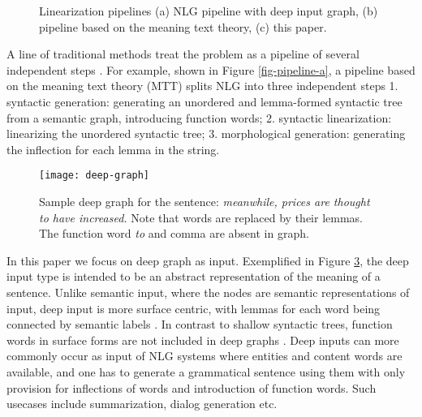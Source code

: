 \documentclass[11pt]{article}
\begin{document}
\begin{figure}[t]
\begin{subfigure}[b]{0.4\textwidth}
\caption{}
\label{fig-pipeline-c}
\end{subfigure}
\caption{Linearization pipelines (a) NLG pipeline with deep input graph, (b) pipeline based on the meaning text theory, (c) this paper.} \label{pipeline}
\vspace*{-1em}
\end{figure}


A line of traditional methods treat the problem as a pipeline of several independent steps \cite{bohnet2010broad,E09-1097,W00-1401,W00-0306,C98-1112}. For example, shown in Figure \ref{fig-pipeline-a}, a pipeline based on the meaning text theory (MTT) \cite{melʹvcuk1988dependency} splits NLG into three independent steps 1. syntactic generation: generating an unordered and lemma-formed syntactic tree from a semantic graph, introducing function words; 2. syntactic linearization: linearizing the unordered syntactic tree; 3. morphological generation: generating the inflection for each lemma in the string.

\begin{figure}[t]
\centering
\small
\texttt{[image: deep-graph]}
\caption{Sample deep graph for the sentence: {\it meanwhile, prices are thought to have increased.} Note that words are replaced by their lemmas. The function word {\it to} and comma are absent in graph.}
\label{fig-deep-graph}
\vspace*{-1em}
\end{figure}

In this paper we focus on deep graph as input. Exemplified in Figure \ref{fig-deep-graph}, the deep input type is intended to be an abstract representation of the meaning of a sentence. Unlike semantic input, where the nodes are semantic representations of input, deep input is more surface centric, with lemmas for each word being connected by semantic labels \cite{W13-2322,mel2015semantics}. In contrast to shallow syntactic trees, function words in surface forms are not included in deep graphs \cite{belz2011first}. Deep inputs can more commonly occur as input of NLG systems where entities and content words are available, and one has to generate a grammatical sentence using them with only provision for inflections of words and introduction of function words. Such usecases include summarization, dialog generation etc.
\end{document}

